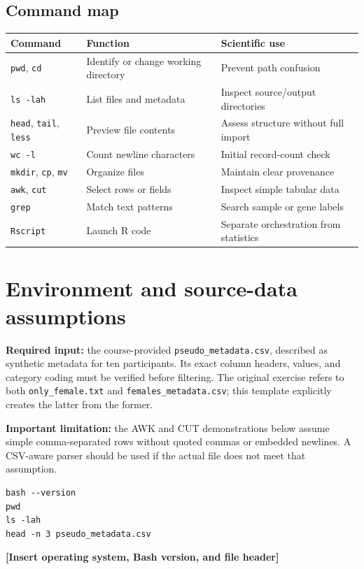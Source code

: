 \documentclass[11pt,letterpaper]{article}
\newcommand{\fillin}[1]{\textbf{[Insert #1]}}
\begin{document}
\subsection{Command map}
\begin{longtable}{p{.18\linewidth}p{.35\linewidth}p{.35\linewidth}}
\toprule
Command & Function & Scientific use\\ \midrule
\endhead
\texttt{pwd}, \texttt{cd} & Identify or change working directory & Prevent path confusion\\
\texttt{ls -lah} & List files and metadata & Inspect source/output directories\\
\texttt{head}, \texttt{tail}, \texttt{less} & Preview file contents & Assess structure without full import\\
\texttt{wc -l} & Count newline characters & Initial record-count check\\
\texttt{mkdir}, \texttt{cp}, \texttt{mv} & Organize files & Maintain clear provenance\\
\texttt{awk}, \texttt{cut} & Select rows or fields & Inspect simple tabular data\\
\texttt{grep} & Match text patterns & Search sample or gene labels\\
\texttt{Rscript} & Launch R code & Separate orchestration from statistics\\
\bottomrule
\end{longtable}

\section{Environment and source-data assumptions}
\textbf{Required input:} the course-provided \texttt{pseudo\_metadata.csv},
described as synthetic metadata for ten participants. Its exact column headers,
values, and category coding must be verified before filtering. The original
exercise refers to both \texttt{only\_female.txt} and
\texttt{females\_metadata.csv}; this template explicitly creates the latter
from the former.

\noindent\textbf{Important limitation:} the AWK and CUT demonstrations below
assume simple comma-separated rows without quoted commas or embedded newlines.
A CSV-aware parser should be used if the actual file does not meet that
assumption.

\begin{lstlisting}
bash --version
pwd
ls -lah
head -n 3 pseudo_metadata.csv
\end{lstlisting}
\noindent\fillin{operating system, Bash version, and file header}
\end{document}
